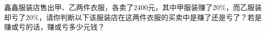 鑫鑫服装店售出甲、乙两件衣服，各卖了2400元，其中甲服装赚了20$\%$，而乙服装却亏了20$\%$，请你判断以下该服装店在这两件衣服的买卖中是赚了还是亏了？若是赚或亏的话，赚或亏多少元钱？



